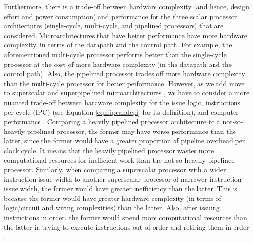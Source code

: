 Furthermore, there is a trade-off between hardware complexity (and hence, design effort and power consumption) and performance for the three scalar processor architectures (single-cycle, multi-cycle, and pipelined processors) that are considered. Microarchitectures that have better performance have more hardware complexity, in terms of the datapath and the control path. For example, the aforementioned multi-cycle processor performs better than the single-cycle processor at the cost of more hardware complexity (in the datapath and the control path). Also, the pipelined processor trades off more hardware complexity than the multi-cycle processor for better performance. However, as we add move to superscalar and superpipelined microarchitectures \cite{Jouppi1989}, we have to consider a more nuanced trade-off between hardware complexity for the issue logic, instructions per cycle (IPC) (see Equation \ref{eqn:ipcandcpi} for its definition), and computer performance \cite{Hrishikesh2002,Palacharla1998}. Comparing a heavily pipelined processor architecture to a not-so-heavily pipelined processor, the former may have worse performance than the latter, since the former would have a greater proportion of pipeline overhead per clock cycle. It means that the heavily pipelined processor wastes more computational resources for inefficient work than the not-so-heavily pipelined processor. Similarly, when comparing a superscalar processor with a wider instruction issue width to another superscalar processor of narrower instruction issue width, the former would have greater inefficiency than the latter. This is because the former would have greater hardware complexity (in terms of logic/circuit and wiring complexities) than the latter. Also, after issuing instructions in order, the former would spend more computational resources than the latter in trying to execute instructions out of order and retiring them in order \cite{Shen2005a,Hennessy2012}. \\

